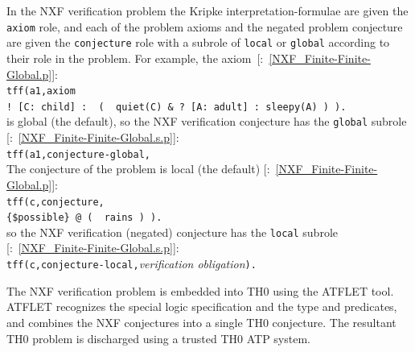 \documentclass{easychair}
\newcommand{\smalltt}[1]{\small \texttt{#1}}
\newcommand{\example}{{\scriptsize \faFile[regular]}}
\newcommand{\tildenot}{\raisebox{0.4ex}{\texttildelow}}
\begin{document}
In the NXF verification problem the Kripke interpretation-formulae are given the \smalltt{axiom} 
role, and each of the problem axioms and the negated problem conjecture are given the 
\smalltt{conjecture} role with a subrole of \smalltt{local} or \smalltt{global} according to 
their role in the problem.
For example, the axiom~[\example{}:~\ref{NXF_Finite-Finite-Global.p}]: \\
\hspace*{0.5cm}\smalltt{tff(a1,axiom} \\
\hspace*{0.9cm}\smalltt{! [C: child] : \tildenot{}\,( \tildenot{}\,quiet(C) \& ? [A: adult] : sleepy(A) ) ).}\\
is global (the default), so the NXF verification conjecture has the \smalltt{global} subrole
[\example{}:~\ref{NXF_Finite-Finite-Global.s.p}]: \\
\hspace*{0.5cm}\smalltt{tff(a1,conjecture-global,} \\
The conjecture of the problem is local (the default) 
[\example{}:~\ref{NXF_Finite-Finite-Global.p}]: \\
\hspace*{0.5cm}\smalltt{tff(c,conjecture,} \\
\hspace*{0.9cm}\smalltt{\{\$possible\}\,@\,(\,\tildenot{}\,rains\,)\,).} \\
so the NXF verification (negated) conjecture has the \smalltt{local} subrole
[\example{}:~\ref{NXF_Finite-Finite-Global.s.p}]: \\
\hspace*{0.5cm}\smalltt{tff(c,conjecture-local,}\emph{verification obligation}\smalltt{).}

The NXF verification problem is embedded into TH0 using the ATFLET tool.
ATFLET recognizes the special logic specification and the type and predicates, and combines
the NXF conjectures into a single TH0 conjecture.
The resultant TH0 problem is discharged using a trusted TH0 ATP system.
\end{document}
